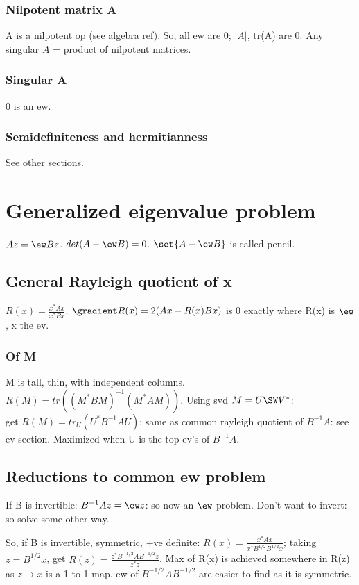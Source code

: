 \documentclass[oneside, article]{memoir}
\begin{document}
\subsubsection{Nilpotent matrix A}
A is a nilpotent op (see algebra ref). So, all ew are 0; $|A|$, tr(A) are 0. Any singular $A$ = product of nilpotent matrices.

\subsubsection{Singular A}
0 is an ew.

\subsubsection{Semidefiniteness and hermitianness}
See other sections.

\section{Generalized eigenvalue problem}
$Az = \ew Bz$. $det(A-\ew B) = 0$. $\set{A-\ew B}$ is called pencil.

\subsection{General Rayleigh quotient of x}
$R(x) = \frac{x^{*}Ax}{x^{*}Bx}$. $\gradient R(x) = 2(Ax-R(x)Bx)$ is 0 exactly where R(x) is $\ew$, x the ev.

\subsubsection{Of M}
M is tall, thin, with independent columns. \\
$R(M) = tr((M^{*}BM)^{-1} (M^{*}AM))$. Using svd $M = U\SW V^{*}$:\\ get $R(M) = tr_{U}(U^{*}B^{-1}AU)$: same as common rayleigh quotient of $B^{-1}A$: see ev section. Maximized when U is the top ev's of $B^{-1}A$.

\subsection{Reductions to common ew problem}
If B is invertible: $B^{-1}Az = \ew z$: so now an $\ew$ problem. Don't want to invert: so solve some other way.

So, if B is invertible, symmetric, +ve definite: $R(x) = \frac{x^{*}Ax}{x^{*}B^{1/2}B^{1/2}x}$; taking $z=B^{1/2}x$, get $R(z) = \frac{z^{*}B^{-1/2}AB^{-1/2}z}{z^{*}z}$. Max of R(x) is achieved somewhere in R(z) as $z \to x$ is a 1 to 1 map. ew of $B^{-1/2}AB^{-1/2}$ are easier to find as it is symmetric.
\end{document}
